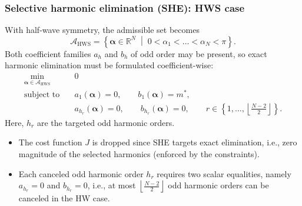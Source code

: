 \begin{frame}
    \frametitle{Selective harmonic elimination (SHE): HWS case}
    With half-wave symmetry, the admissible set becomes
    \begin{equation}
        \mathcal{A}_{\mathrm{HWS}}=
        \left\{\bm{\alpha}\in\mathbb{R}^N\;\middle|\;0<\alpha_1<\ldots<\alpha_N<\pi\right\}.
    \end{equation}\pause
    Both coefficient families \(a_h\) and \(b_h\) of odd order may be present, so exact harmonic elimination must be formulated coefficient-wise:
    \begin{equation}
        \begin{aligned}
            \min_{\bm{\alpha}\in\mathcal{A}_{\mathrm{HWS}}} \quad & 0                       \\
            \text{subject to} \quad                               & a_1(\bm{\alpha})=0,
            \qquad b_1(\bm{\alpha})=m^*,                                                    \\
                                                                  & a_{h_r}(\bm{\alpha})=0,
            \qquad b_{h_r}(\bm{\alpha})=0,
            \qquad r\in\left\{1,\ldots,\left\lfloor\frac{N-2}{2}\right\rfloor\right\}.
        \end{aligned}
        \label{eq:general_she_hw_rev1}
    \end{equation}\pause
    Here, \(h_r\) are the targeted odd harmonic orders.

    \begin{itemize}\pause
        \item The cost function $J$ is dropped since SHE targets exact elimination, i.e., zero magnitude of the selected harmonics (enforced by the constraints).\pause
        \item Each canceled odd harmonic order \(h_r\) requires two scalar equalities, namely \(a_{h_r}=0\) and \(b_{h_r}=0\), i.e., at most \(\left\lfloor\frac{N-2}{2}\right\rfloor\) odd harmonic orders can be canceled in the HW case.
    \end{itemize}
\end{frame}

